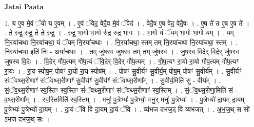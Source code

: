 \documentclass[17pt]{extarticle}
\begin{document}
\textbf{Jatai Paata} \newline

1. य ए॒व मे॒वं ॅयो य ए॒वम् । . ए॒वं ॅवेद॒ वेदै॒व मे॒वं ॅवेद॑ । . वेदै॒ष ए॒ष वेद॒ वेदै॒षः । . ए॒ष ते॑ त ए॒ष ए॒ष ते᳚ । . ते॒ रु॒द्र॒ रु॒द्र॒ ते॒ ते॒ रु॒द्र॒ । . रु॒द्र॒ भा॒गो भा॒गो रु॑द्र रुद्र भा॒गः । . भा॒गो यं ॅयम् भा॒गो भा॒गो यम् । . यम् नि॒रया॑चथा नि॒रया॑चथा॒ यं ॅयम् नि॒रया॑चथाः । . नि॒रया॑चथा॒ स्तम् तम् नि॒रया॑चथा नि॒रया॑चथा॒ स्तम् । . नि॒रया॑चथा॒ इति॑ निः - अया॑चथाः । . तम् जु॑षस्व जुषस्व॒ तम् तम् जु॑षस्व । . जु॒ष॒स्व॒ वि॒देर् वि॒देर् जु॑षस्व जुषस्व वि॒देः । . वि॒देर् गौ॑प॒त्यम् गौ॑प॒त्यं ॅवि॒देर् वि॒देर् गौ॑प॒त्यम् । . गौ॒प॒त्यꣳ रा॒यो रा॒यो गौ॑प॒त्यम् गौ॑प॒त्यꣳ रा॒यः । . रा॒य स्पोष॒म् पोषꣳ॑ रा॒यो रा॒य स्पोष᳚म् । . पोषꣳ॑ सु॒वीर्यꣳ॑ सु॒वीर्य॒म् पोष॒म् पोषꣳ॑ सु॒वीर्य᳚म् । . सु॒वीर्यꣳ॑ संॅवथ्स॒रीणाꣳ॑ संॅवथ्स॒रीणाꣳ॑ सु॒वीर्यꣳ॑ सु॒वीर्यꣳ॑ संॅवथ्स॒रीणा᳚म् । . सु॒वीर्य॒मिति॑ सु - वीर्य᳚म् । . सं॒ॅव॒थ्स॒रीणाꣳ॑ स्व॒स्तिꣳ स्व॒स्तिꣳ सं॑ॅवथ्स॒रीणाꣳ॑ संॅवथ्स॒रीणाꣳ॑ स्व॒स्तिम् । . सं॒ॅव॒थ्स॒रीणा॒मिति॑ सं - व॒थ्स॒रीणा᳚म् । . स्व॒स्तिमिति॑ स्व॒स्तिम् । . मनुः॑ पु॒त्रेभ्यः॑ पु॒त्रेभ्यो॒ मनु॒र् मनुः॑ पु॒त्रेभ्यः॑ । . पु॒त्रेभ्यो॑ दा॒यम् दा॒यम् पु॒त्रेभ्यः॑ पु॒त्रेभ्यो॑ दा॒यम् । . दा॒यं ॅवि वि दा॒यम् दा॒यं ॅवि । . व्य॑भज दभज॒द् वि व्य॑भजत् । . अ॒भ॒ज॒थ् स सो॑ ऽभज दभज॒थ् सः । \newline
\end{document}
